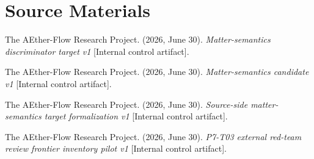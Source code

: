 \section{Source Materials}

The AEther-Flow Research Project. (2026, June 30). \emph{Matter-semantics
discriminator target v1} [Internal control artifact].

The AEther-Flow Research Project. (2026, June 30). \emph{Matter-semantics
candidate v1} [Internal control artifact].

The AEther-Flow Research Project. (2026, June 30). \emph{Source-side
matter-semantics target formalization v1} [Internal control artifact].

The AEther-Flow Research Project. (2026, June 30). \emph{P7-T03 external
red-team review frontier inventory pilot v1} [Internal control artifact].
